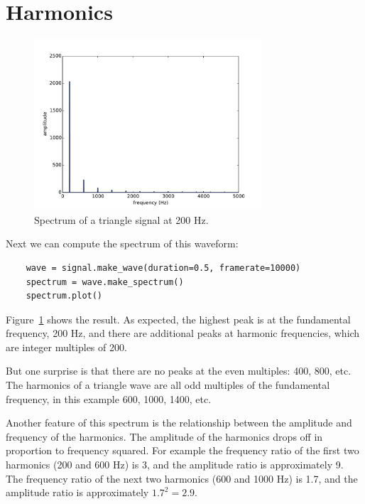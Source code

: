 \documentclass[12pt]{book}
\begin{document}
\section{Harmonics}
\label{harmonics}

\begin{figure}
\centerline{\includegraphics[height=2.5in]{figs/triangle-200-2.pdf}}
\caption{Spectrum of a triangle signal at 200 Hz.}
\label{fig.triangle.200.2}
\end{figure}

Next we can compute the spectrum of this waveform:

\begin{verbatim}
    wave = signal.make_wave(duration=0.5, framerate=10000)
    spectrum = wave.make_spectrum()
    spectrum.plot()
\end{verbatim}

Figure~\ref{fig.triangle.200.2} shows the result.  As expected, the
highest peak is at the fundamental frequency, 200 Hz, and there
are additional peaks at harmonic frequencies, which are integer
multiples of 200.

But one surprise is that there are no peaks at the even multiples:
400, 800, etc.  The harmonics of a triangle wave are all
odd multiples of the fundamental frequency, in this example
600, 1000, 1400, etc.

Another feature of this spectrum is the relationship between the
amplitude and frequency of the harmonics.  The amplitude of the
harmonics drops off in proportion to frequency squared.  For example
the frequency ratio of the first two harmonics (200 and 600 Hz) is 3,
and the amplitude ratio is approximately 9.  The frequency ratio of
the next two harmonics (600 and 1000 Hz) is 1.7, and the amplitude
ratio is approximately $1.7^2 = 2.9$.
\end{document}
